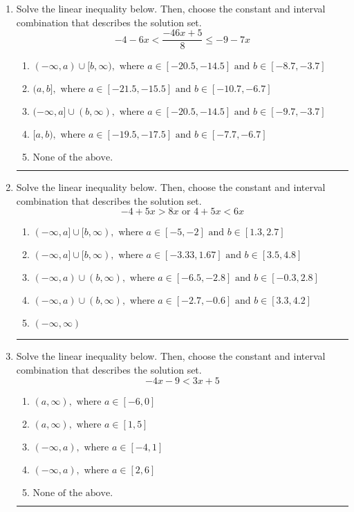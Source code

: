 \documentclass[14pt]{extbook}
\newcommand{\litem}[1]{\item#1\hspace*{-1cm}\rule{\textwidth}{0.4pt}}
\begin{document}
\begin{enumerate}
{\begin{enumerate}[label=\Alph*.]
\end{enumerate} }
\litem{
Solve the linear inequality below. Then, choose the constant and interval combination that describes the solution set.\[ -4 - 6 x < \frac{-46 x + 5}{8} \leq -9 - 7 x \]\begin{enumerate}[label=\Alph*.]
\item \( (-\infty, a) \cup [b, \infty), \text{ where } a \in [-20.5, -14.5] \text{ and } b \in [-8.7, -3.7] \)
\item \( (a, b], \text{ where } a \in [-21.5, -15.5] \text{ and } b \in [-10.7, -6.7] \)
\item \( (-\infty, a] \cup (b, \infty), \text{ where } a \in [-20.5, -14.5] \text{ and } b \in [-9.7, -3.7] \)
\item \( [a, b), \text{ where } a \in [-19.5, -17.5] \text{ and } b \in [-7.7, -6.7] \)
\item \( \text{None of the above.} \)

\end{enumerate} }
\litem{
Solve the linear inequality below. Then, choose the constant and interval combination that describes the solution set.\[ -4 + 5 x > 8 x \text{ or } 4 + 5 x < 6 x \]\begin{enumerate}[label=\Alph*.]
\item \( (-\infty, a] \cup [b, \infty), \text{ where } a \in [-5, -2] \text{ and } b \in [1.3, 2.7] \)
\item \( (-\infty, a] \cup [b, \infty), \text{ where } a \in [-3.33, 1.67] \text{ and } b \in [3.5, 4.8] \)
\item \( (-\infty, a) \cup (b, \infty), \text{ where } a \in [-6.5, -2.8] \text{ and } b \in [-0.3, 2.8] \)
\item \( (-\infty, a) \cup (b, \infty), \text{ where } a \in [-2.7, -0.6] \text{ and } b \in [3.3, 4.2] \)
\item \( (-\infty, \infty) \)

\end{enumerate} }
\litem{
Solve the linear inequality below. Then, choose the constant and interval combination that describes the solution set.\[ -4x -9 < 3x + 5 \]\begin{enumerate}[label=\Alph*.]
\item \( (a, \infty), \text{ where } a \in [-6, 0] \)
\item \( (a, \infty), \text{ where } a \in [1, 5] \)
\item \( (-\infty, a), \text{ where } a \in [-4, 1] \)
\item \( (-\infty, a), \text{ where } a \in [2, 6] \)
\item \( \text{None of the above}. \)


\end{enumerate}}
\end{enumerate}
\end{document}
